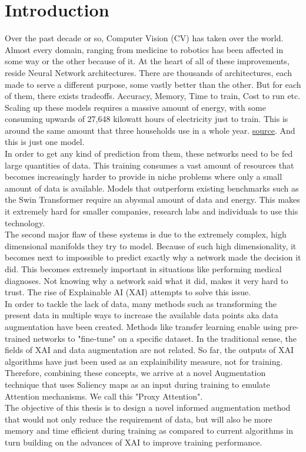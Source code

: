 \section{Introduction}
Over the past decade or so, Computer Vision (CV) has taken over the world. Almost every domain, ranging from medicine to robotics has been affected in some way or the other because of it. At the heart of all of these improvements, reside Neural Network architectures. There are thousands of architectures, each made to serve a different purpose, some vastly better than the other. But for each of them, there exists tradeoffs. Accuracy, Memory, Time to train, Cost to run etc. Scaling up these models requires a massive amount of energy, with some consuming upwards of 27,648 kilowatt hours of electricity just to train. This is around the same amount that three households use in a whole year. \href{https://www.techtarget.com/searchenterpriseai/feature/Energy-consumption-of-AI-poses-environmental-problems}{source}. And this is just one model.\\
In order to get any kind of prediction from them, these networks need to be fed large quantities of data. This training consumes a vast amount of resources that becomes increasingly harder to provide in niche problems where only a small amount of data is available. Models that outperform existing benchmarks such as the Swin Transformer \cite{liu_swin_2022} require an abysmal amount of data and energy. This makes it extremely hard for smaller companies, research labs and individuals to use this technology.\\
The second major flaw of these systems is due to the extremely complex, high dimensional manifolds they try to model. Because of such high dimensionality, it becomes next to impossible to predict exactly why a network made the decision it did. This becomes extremely important in situations like performing medical diagnoses. Not knowing why a network said what it did, makes it very hard to trust. The rise of Explainable AI (XAI) attempts to solve this issue.\\
In order to tackle the lack of data, many methods such as transforming the present data in multiple ways to increase the available data points aka data augmentation have been created. Methods like transfer learning enable using pre-trained networks to "fine-tune" on a specific dataset. In the traditional sense, the fields of XAI and data augmentation are not related. So far, the outputs of XAI algorithms have just been used as an explainibility measure, not for training.
Therefore, combining these concepts, we arrive at a novel Augmentation technique that uses Saliency maps as an input during training to emulate Attention \cite{vaswani_attention_2017} mechanisms. We call this "Proxy Attention".\\
The objective of this thesis is to design a novel informed augmentation method that would not only reduce the requirement of data, but will also be more memory and time efficient during training as compared to current algorithms in turn building on the advances of XAI to improve training performance.